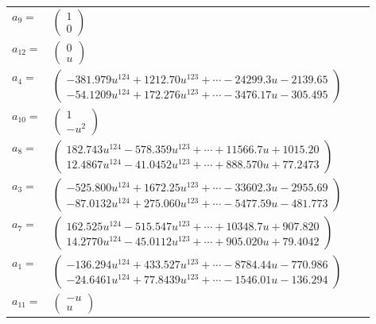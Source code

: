 \documentclass[1p]{elsarticle_modified}
\theoremstyle{definition}
\begin{document}
\begin{tabular}{m{7pt} m{180pt} m{7pt} m{180pt} }
\flushright $a_{9}=$&$\begin{pmatrix}1\\0\end{pmatrix}$ \\
\flushright $a_{12}=$&$\begin{pmatrix}0\\u\end{pmatrix}$ \\
\flushright $a_{4}=$&$\begin{pmatrix}-381.979 u^{124}+1212.70 u^{123}+\cdots-24299.3 u-2139.65\\-54.1209 u^{124}+172.276 u^{123}+\cdots-3476.17 u-305.495\end{pmatrix}$ \\
\flushright $a_{10}=$&$\begin{pmatrix}1\\- u^2\end{pmatrix}$ \\
\flushright $a_{8}=$&$\begin{pmatrix}182.743 u^{124}-578.359 u^{123}+\cdots+11566.7 u+1015.20\\12.4867 u^{124}-41.0452 u^{123}+\cdots+888.570 u+77.2473\end{pmatrix}$ \\
\flushright $a_{3}=$&$\begin{pmatrix}-525.800 u^{124}+1672.25 u^{123}+\cdots-33602.3 u-2955.69\\-87.0132 u^{124}+275.060 u^{123}+\cdots-5477.59 u-481.773\end{pmatrix}$ \\
\flushright $a_{7}=$&$\begin{pmatrix}162.525 u^{124}-515.547 u^{123}+\cdots+10348.7 u+907.820\\14.2770 u^{124}-45.0112 u^{123}+\cdots+905.020 u+79.4042\end{pmatrix}$ \\
\flushright $a_{1}=$&$\begin{pmatrix}-136.294 u^{124}+433.527 u^{123}+\cdots-8784.44 u-770.986\\-24.6461 u^{124}+77.8439 u^{123}+\cdots-1546.01 u-136.294\end{pmatrix}$ \\
\flushright $a_{11}=$&$\begin{pmatrix}- u\\u\end{pmatrix}$ \\

\end{tabular}
\end{document}
